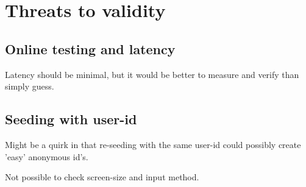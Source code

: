 \section{Threats to validity}

  \subsection{Online testing and latency}

    Latency should be minimal, but it would be better to measure and
    verify than simply guess.

  \subsection{Seeding with user-id}

    Might be a quirk in that re-seeding with the same user-id could
    possibly create 'easy' anonymous id's.

  Not possible to check screen-size and input method.

